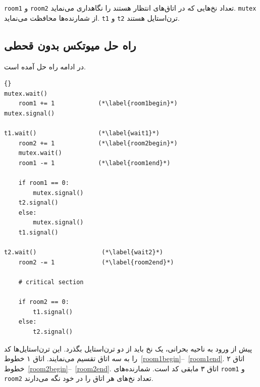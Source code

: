 \documentclass{book}
\newcommand{\clearemptydoublepage}{\newpage\cleardoublepage}
\begin{document}
    {\tt room1} و  {\tt room2} 
    تعداد نخ‌هایی که در اتاق‌های انتظار هستند را نگاهداری می‌نماید. {\tt mutex} از شمارنده‌ها محافظت می‌نماید. {\tt t1} و {\tt t2}
    ترن‌استایل هستند. 
    


\clearemptydoublepage
\subsection{راه حل میوتکس بدون قحطی}

    در ادامه راه حل  آمده است. 

\begin{latin}
\begin{latin}
\begin{lstlisting}[title=\rl{الگوریتم  \lr{Morris}}]{}
mutex.wait()
    room1 += 1            (*\label{room1begin}*)
mutex.signal()
                           
t1.wait()                 (*\label{wait1}*)
    room2 += 1            (*\label{room2begin}*)
    mutex.wait()
    room1 -= 1            (*\label{room1end}*)

    if room1 == 0: 
        mutex.signal()
	t2.signal()
    else: 
        mutex.signal()
	t1.signal()

t2.wait()                  (*\label{wait2}*)
    room2 -= 1             (*\label{room2end}*)

    # critical section

    if room2 == 0:
        t1.signal()
    else:
        t2.signal()
\end{lstlisting}
\end{latin}
\end{latin}

    پیش از ورود به ناحیه بحرانی، یک نخ باید از دو ترن‌استایل بگذرد. 
    این ترن‌استایل‌ها کد را به سه اتاق تقسیم می‌نمایند. اتاق ۱ خطوط~\ref{room1begin}--~\ref{room1end}.
    اتاق ۲ خطوط~\ref{room2begin}--~\ref{room2end}. اتاق ۳ مابقی  کد  است. 
    شمارنده‌های {\tt room1} و {\tt room2} تعداد نخ‌های هر اتاق را در خود نگه می‌دارند. 
\end{document}
